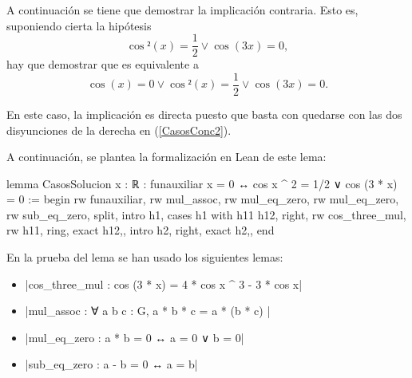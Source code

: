 \begin{demostracion}
  \noindent
  \framebox{\longleftarrow} A continuación se tiene que demostrar
  la implicación contraria. Esto es, suponiendo cierta la
  hipótesis
  \begin{equation}\label{Casosh2}\tag{h2}
    \cos²(x)=\frac{1}{2} \lor \cos(3x)=0,
  \end{equation}
  hay que demostrar que es equivalente a
  \begin{equation}\label{CasosConc2}
    \cos(x)=0 \lor \cos²(x)=\frac{1}{2}\lor \cos(3x)=0.
  \end{equation}

  En este caso, la implicación es directa puesto que basta con
  quedarse con las dos disyunciones de la derecha en
  (\ref{CasosConc2}).
\end{demostracion}

A continuación, se plantea la formalización en Lean de este lema:
\begin{leancode}
lemma CasosSolucion {x : ℝ} :
funauxiliar x = 0 ↔ cos x ^ 2 = 1/2 ∨ cos (3 * x) = 0 :=
begin
  rw funauxiliar,
  rw mul_assoc,
  rw mul_eq_zero,
  rw mul_eq_zero,
  rw sub_eq_zero,
  split,
  {intro h1,
  cases h1 with h11 h12,
  right,
  rw cos_three_mul,
  rw h11,
  ring,
  exact h12,},
  {intro h2,
  right,
  exact h2,},
end
\end{leancode}

En la prueba del lema se han usado los siguientes lemas:
\begin{itemize}
\item {}|cos_three_mul : cos (3 * x) = 4 * cos x ^ 3 - 3 * cos x|
\item {}|mul_assoc : ∀ a b c : G, a * b * c = a * (b * c) |
\item {}|mul_eq_zero : a * b = 0 ↔ a = 0 ∨ b = 0|
\item {}|sub_eq_zero : a - b = 0 ↔ a = b|
\end{itemize}

